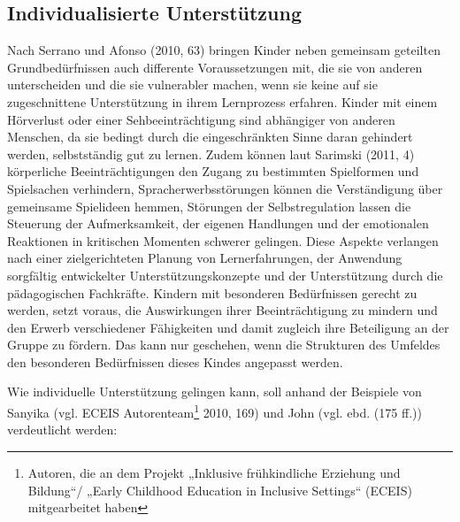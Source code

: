 \subsection{Individualisierte Unterstützung} 
\label{Individualisierung}
Nach Serrano und Afonso (2010, 63) bringen Kinder neben gemeinsam geteilten Grundbe\-dürfnissen auch differente Voraussetzungen mit, die sie von anderen unterscheiden und die sie vulnerabler machen, wenn sie keine auf sie zugeschnittene Unterstützung in ihrem Lernprozess erfahren. Kinder mit einem Hörverlust oder einer Sehbeeinträchtigung sind abhängiger von anderen Menschen, da sie bedingt durch die eingeschränkten Sinne daran gehindert werden, selbstständig gut zu lernen. Zudem können laut Sarimski (2011, 4) körperliche Beeinträchtigungen den Zugang zu bestimmten Spielformen und Spielsachen verhindern, Spracherwerbsstörungen können die Verständigung über gemeinsame Spielideen hemmen, Störungen der Selbstregulation lassen die Steuerung der Aufmerksamkeit, der eigenen Handlungen und der emotionalen Reaktionen in kritischen Momenten schwerer gelingen.    
Diese Aspekte verlangen nach einer zielgerichteten Planung von Lernerfahrungen, der Anwendung sorgfältig entwickelter Unterstützungskonzepte und der Unterstützung durch die pädagogischen Fachkräfte. Kindern mit besonderen Bedürfnissen gerecht zu werden, setzt voraus, die Auswirkungen ihrer Beeinträchtigung zu mindern und den Erwerb verschiedener Fähigkeiten und damit zugleich ihre Beteiligung an der Gruppe zu fördern. Das kann nur geschehen, wenn die Strukturen des Umfeldes den besonderen Bedürfnissen dieses Kindes angepasst werden. 

Wie individuelle Unterstützung gelingen kann, soll anhand der Beispiele von Sanyika (vgl. ECEIS Autorenteam\footnote{Autoren, die an dem Projekt „Inklusive frühkindliche Erziehung und Bildung“/ „Early Childhood Education in Inclusive Settings“ (ECEIS) mitgearbeitet haben} 2010, 169) und John (vgl. ebd. (175 ff.)) verdeutlicht werden:

